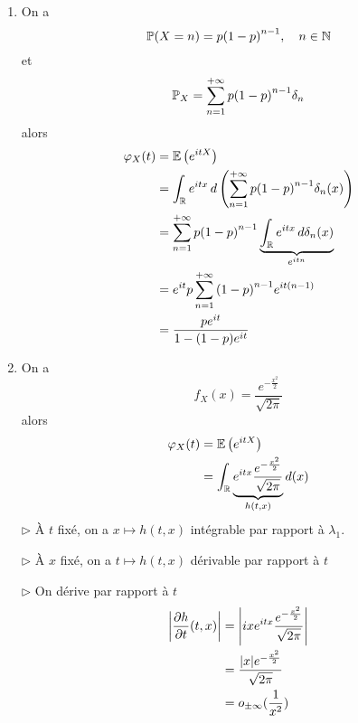 {\begin{td-sol}[]
\begin{enumerate}
            \item On a
            \begin{equation*}
                \mathbb{P}(X = n) = p{(1-p)}^{n-1}, \quad n\in\mathbb{N}
            \end{equation*}
            et
            \begin{equation*}
                \mathbb{P}_X = \sum_{n=1}^{+\infty} p{(1-p)}^{n-1}\delta_n
            \end{equation*}
            alors
            \begin{equation*}
                \begin{aligned}
                    \varphi_X(t)
                    &= \mathbb{E}\left(e^{itX}\right)\\
                    &= \int_{\mathbb{R}} e^{itx} \mathop{}\!{d} \left(\sum_{n=1}^{+\infty} p{(1-p)}^{n-1}\delta_n(x)\right)\\
                    &= \sum_{n=1}^{+\infty} p{(1-p)}^{n-1} \underbrace{\int_{\mathbb{R}} e^{itx} \mathop{}\!{d} \delta_n(x)}_{e^{itn}}\\
                    &= e^{it} p \sum_{n=1}^{+\infty} {(1-p)}^{n-1} e^{it(n-1)}\\
                    &= \frac{pe^{it}}{1-(1-p)e^{it}}
                \end{aligned}
            \end{equation*}

            \item On a
            \begin{equation*}
                f_X(x) = \frac{e^{-\frac{x^2}{2}}}{\sqrt{2\pi}}
            \end{equation*}
            alors
            \begin{equation*}
                \begin{aligned}
                    \varphi_X(t)
                    &= \mathbb{E}\left(e^{itX}\right)\\
                    &= \int_{\mathbb{R}} \underbrace{e^{itx} \frac{e^{-\frac{x^2}{2}}}{\sqrt{2\pi}}}_{h(t,x)} \mathop{}\!{d}(x)\\
                \end{aligned}
            \end{equation*}
            \(\triangleright\) À \(t\) fixé, on a \(x\mapsto h(t,x)\) intégrable
            par rapport à \(\lambda_1\).

            \(\triangleright\) À \(x\) fixé, on a \(t\mapsto h(t,x)\) dérivable
            par rapport à \(t\)

            \(\triangleright\) On dérive par rapport à \(t\)
            \begin{equation*}
                \begin{aligned}
                    \mathopen{}\left|\frac{\partial h}{\partial t}(t,x)\right|\mathclose{} 
                    &= \mathopen{}\left|ix e^{itx} \frac{e^{-\frac{x^2}{2}}}{\sqrt{2\pi}}\right|\mathclose{}\\
                    &= \frac{\mathopen{}\left|x\right|\mathclose{} e^{-\frac{x^2}{2}}}{\sqrt{2\pi}}\\
                    &= o_{\pm \infty}(\frac{1}{x^2})
                \end{aligned}
            \end{equation*}


\end{enumerate}
\end{td-sol}}
